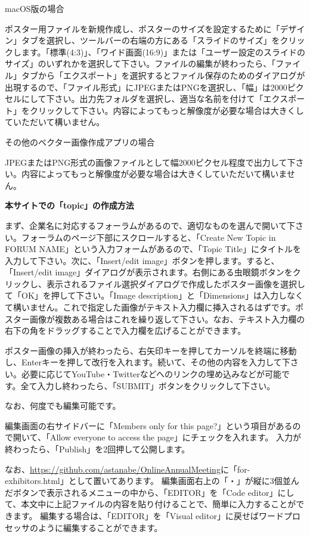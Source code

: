 \documentclass[titlepage,10pt,a4paper,uplatex]{jsbook}
\newenvironment{content}{\begin{shaded}\vspace{-1em}\raggedright\ttfamily\footnotesize\setlength{\baselineskip}{1.4em}}{\end{shaded}\vspace{-1em}}
\renewcommand{\textbf}[1]{{\bfseries\sffamily#1}}
\begin{document}
\begin{content}
{\large macOS版の場合}

ポスター用ファイルを新規作成し、ポスターのサイズを設定するために「デザイン」タブを選択し、ツールバーの右端の方にある「スライドのサイズ」をクリックします。「標準(4:3)」、「ワイド画面(16:9)」または「ユーザー設定のスライドのサイズ」のいずれかを選択して下さい。ファイルの編集が終わったら、「ファイル」タブから「エクスポート」を選択するとファイル保存のためのダイアログが出現するので、「ファイル形式」にJPEGまたはPNGを選択し、「幅」は2000ピクセルにして下さい。出力先フォルダを選択し、適当な名前を付けて「エクスポート」をクリックして下さい。内容によってもっと解像度が必要な場合は大きくしていただいて構いません。

{\Large その他のベクター画像作成アプリの場合}

JPEGまたはPNG形式の画像ファイルとして幅2000ピクセル程度で出力して下さい。内容によってもっと解像度が必要な場合は大きくしていただいて構いません。

\textbf{\Large 本サイトでの「topic」の作成方法}

まず、企業名に対応するフォーラムがあるので、適切なものを選んで開いて下さい。フォーラムのページ下部にスクロールすると、「Create New Topic in FORUM NAME」という入力フォームがあるので、「Topic Title」にタイトルを入力して下さい。次に、「Insert/edit image」ボタンを押します。すると、「Insert/edit image」ダイアログが表示されます。右側にある虫眼鏡ボタンをクリックし、表示されるファイル選択ダイアログで作成したポスター画像を選択して「OK」を押して下さい。「Image description」と「Dimensions」は入力しなくて構いません。これで指定した画像がテキスト入力欄に挿入されるはずです。ポスター画像が複数ある場合はこれを繰り返して下さい。なお、テキスト入力欄の右下の角をドラッグすることで入力欄を広げることができます。

ポスター画像の挿入が終わったら、右矢印キーを押してカーソルを終端に移動し、Enterキーを押して改行を入れます。続いて、その他の内容を入力して下さい。必要に応じてYouTube・Twitterなどへのリンクの埋め込みなどが可能です。全て入力し終わったら、「SUBMIT」ボタンをクリックして下さい。

なお、何度でも編集可能です。
\end{content}

編集画面の右サイドバーに「Members only for this page?」という項目があるので開いて、「Allow everyone to access the page」にチェックを入れます。
入力が終わったら、「Publish」を2回押して公開します。

なお、\url{https://github.com/astanabe/OnlineAnnualMeeting}に「for-exhibitors.html」として置いてあります。
編集画面右上の「・」が縦に3個並んだボタンで表示されるメニューの中から、「EDITOR」を「Code editor」にして、本文中に上記ファイルの内容を貼り付けることで、簡単に入力することができます。
編集する場合は、「EDITOR」を「Visual editor」に戻せばワードプロセッサのように編集することができます。
\end{document}
